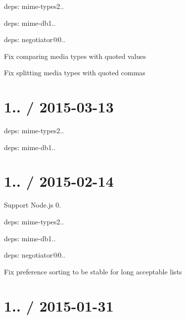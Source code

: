 \begin{DoxyItemize}
\item deps\+: mime-\/types2..
\begin{DoxyItemize}
\item deps\+: mime-\/db1..
\end{DoxyItemize}
\item deps\+: negotiator@0..
\begin{DoxyItemize}
\item Fix comparing media types with quoted values
\item Fix splitting media types with quoted commas
\end{DoxyItemize}
\end{DoxyItemize}

\section*{1.. / 2015-\/03-\/13 }


\begin{DoxyItemize}
\item deps\+: mime-\/types2..
\begin{DoxyItemize}
\item deps\+: mime-\/db1..
\end{DoxyItemize}
\end{DoxyItemize}

\section*{1.. / 2015-\/02-\/14 }


\begin{DoxyItemize}
\item Support Node.\+js 0.
\item deps\+: mime-\/types2..
\begin{DoxyItemize}
\item deps\+: mime-\/db1..
\end{DoxyItemize}
\item deps\+: negotiator@0..
\begin{DoxyItemize}
\item Fix preference sorting to be stable for long acceptable lists
\end{DoxyItemize}
\end{DoxyItemize}

\section*{1.. / 2015-\/01-\/31 }


